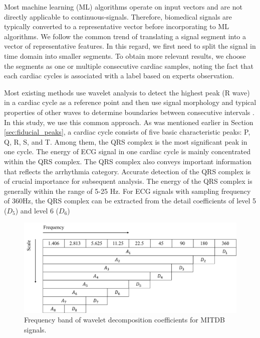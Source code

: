Most machine learning (ML) algorithms operate on input vectors and are not directly applicable to continuous-signals. Therefore, biomedical signals are typically converted to a representative vector before incorporating to ML algorithms. We follow the common trend of translating a signal segment into a vector of representative features. In this regard, we first need to split the signal in time domain into smaller segments. To obtain more relevant results, we choose the segments as one or multiple consecutive cardiac samples, noting the fact that each cardiac cycles is associated with a label based on experts observation. 

Most existing methods use wavelet analysis to detect the highest peak (R wave) in a cardiac cycle as a reference point and then use signal morphology and typical properties of other waves to determine boundaries between consecutive intervals \textcolor{black}{\cite{banerjee2012delineation,2012qrs,fs,jambukia2015classification}}. In this study, we use this common approach. As was mentioned earlier in Section \ref{sec:fiducial_peaks}, a cardiac cycle consists of five basic characteristic peaks: P, Q, R, S, and T. Among them, the QRS complex is the most significant peak in one cycle. The energy of ECG signal in one cardiac cycle is mainly concentrated within the QRS complex. The QRS complex also conveys important information that reflects the arrhythmia category\cite{2012qrs}. Accurate detection of the QRS complex is of crucial importance for subsequent analysis. The energy of the QRS complex is generally within the range of 5-25 Hz. For ECG signals with sampling frequency of 360Hz, the QRS complex can be extracted from the detail coefficients of level 5 ($D_5$) and level 6 ($D_6$)

\begin{figure}[t]
\centering
\includegraphics[scale=.5]{Fig/scale_wavelet.png}
\caption{Frequency band of wavelet decomposition coefficients for MITDB signals.}
\label{fig:wavelet_decomp}
\end{figure}


